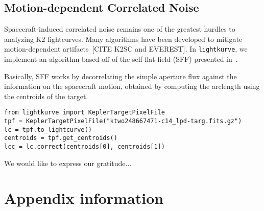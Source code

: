 \documentclass[twocolumn]{aastex62}
\newcommand{\lightkurve}{\texttt{lightkurve}}
\begin{document}
\subsection{Motion-dependent Correlated Noise}
\label{subsection:motion}

Spacecraft-induced correlated noise remains one of the greatest hurdles to
analyzing K2 lightcurves. Many algorithms have been developed to mitigate
motion-dependent artifacts~\cite{vanderburg14}[CITE K2SC and EVEREST].
In \lightkurve, we implement an algorithm based off of the self-flat-field
(SFF) presented in~\cite{vanderburg14}.

Basically, SFF works by decorrelating the simple aperture flux
against the information on the spacecraft motion, obtained by computing the
arclength using the centroids of the target.

\begin{verbatim}
from lightkurve import KeplerTargetPixelFile
tpf = KeplerTargetPixelFile("ktwo248667471-c14_lpd-targ.fits.gz")
lc = tpf.to_lightcurve()
centroids = tpf.get_centroids()
lcc = lc.correct(centroids[0], centroids[1])
\end{verbatim}

\acknowledgments

We would like to express our gratitude...

\vspace{5mm}




\appendix

\section{Appendix information}



\end{document}
